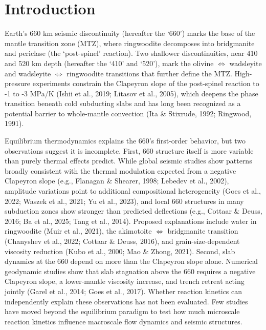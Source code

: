 \documentclass[draft,linenumbers]{agujournal2019}
\begin{document}
\clearpage

\section{Introduction}\label{sec:introduction}

Earth's 660 km seismic discontinuity (hereafter the `660') marks the
base of the mantle transition zone (MTZ), where ringwoodite decomposes
into bridgmanite and periclase (the `post-spinel' reaction). Two
shallower discontinuities, near 410 and 520 km depth (hereafter the
`410' and `520'), mark the olivine \(\Leftrightarrow\) wadsleyite and
wadsleyite \(\Leftrightarrow\) ringwoodite transitions that further
define the MTZ. High-pressure experiments constrain the Clapeyron slope
of the post-spinel reaction to -1 to -3 MPa/K ({Ishii et al.}, 2019;
Litasov et al., 2005), which deepens the phase transition beneath cold
subducting slabs and has long been recognized as a potential barrier to
whole-mantle convection (Ita \& Stixrude, 1992; Ringwood, 1991).

Equilibrium thermodynamics explains the 660's first-order behavior, but
two observations suggest it is incomplete. First, 660 structure itself
is more variable than purely thermal effects predict. While global
seismic studies show patterns broadly consistent with the thermal
modulation expected from a negative Clapeyron slope (e.g., Flanagan \&
Shearer, 1998; Lebedev et al., 2002), amplitude variations point to
additional compositional heterogeneity ({Goes et al.}, 2022; Waszek et
al., 2021; {Yu et al.}, 2023), and local 660 structures in many
subduction zones show stronger than predicted deflections (e.g., Cottaar
\& Deuss, 2016; Ba et al., 2025; Tang et al., 2014). Proposed
explanations include water in ringwoodite (Muir et al., 2021), the
akimotoite \(\Leftrightarrow\) bridgmanite transition ({Chanyshev et
al.}, 2022; Cottaar \& Deuss, 2016), and grain-size-dependent viscosity
reduction (Kubo et al., 2000; Mao \& Zhong, 2021). Second, slab dynamics
at the 660 depend on more than the Clapeyron slope alone. Numerical
geodynamic studies show that slab stagnation above the 660 requires a
negative Clapeyron slope, a lower-mantle viscosity increase, and trench
retreat acting jointly (Garel et al., 2014; {Goes et al.}, 2017).
Whether reaction kinetics can independently explain these observations
has not been evaluated. Few studies have moved beyond the equilibrium
paradigm to test how much microscale reaction kinetics influence
macroscale flow dynamics and seismic structures.
\end{document}
